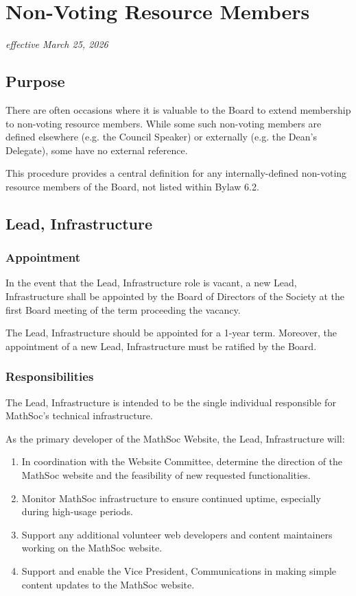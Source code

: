 \section{Non-Voting Resource Members}
\emph{effective March 25, 2026}\\

\subsection{Purpose}
There are often occasions where it is valuable to the Board to extend membership 
to non-voting resource members. While some such non-voting members are defined 
elsewhere (e.g. the Council Speaker) or externally (e.g. the Dean’s Delegate), 
some have no external reference.

This procedure provides a central definition for any internally-defined 
non-voting resource members of the Board, not listed within Bylaw 6.2.

\subsection{Lead, Infrastructure}
\subsubsection{Appointment}
In the event that the Lead, Infrastructure role is vacant, a new Lead, Infrastructure 
shall be appointed by the Board of Directors of the Society at the first 
Board meeting of the term proceeding the vacancy. 

The Lead, Infrastructure should be appointed for a 1-year term. Moreover, the 
appointment of a new Lead, Infrastructure must be ratified by the Board.

\subsubsection{Responsibilities}
The Lead, Infrastructure is intended to be the single individual responsible for 
MathSoc's technical infrastructure.

As the primary developer of the MathSoc Website, the Lead, Infrastructure will:
\begin{enumerate}
    \item In coordination with the Website Committee, determine the direction of 
    the MathSoc website and the feasibility of new requested functionalities.
    \item Monitor MathSoc infrastructure to ensure continued uptime, especially 
    during high-usage periods.
    \item Support any additional volunteer web developers and content 
    maintainers working on the MathSoc website.
    \item Support and enable the Vice President, Communications in making simple 
    content updates to the MathSoc website.
\end{enumerate}

